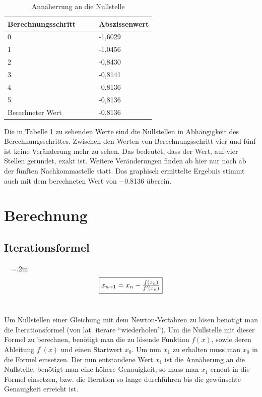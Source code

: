 \documentclass[a4paper,12pt,fleqn,oneside]{article}
\begin{document}
\FloatBarrier
		\begin{table}[]
			\centering
			\begin{tabular}{@{}ll@{}}
				\toprule
				Berechnungsschritt\ \ \ \ 		& Abszissenwert \\ \midrule
				0                  				& -1,6029       \\
				1                  				& -1,0456       \\
				2                  				& -0,8430       \\
				3                  				& -0,8141       \\
				4                  				& -0,8136       \\
				5                  				& -0,8136       \\
				Berechneter Wert   			& -0,8136       \\ \bottomrule
			\end{tabular}
			\caption{Annäherrung an die Nullstelle}
			\label{tab:nullstelle}
		\end{table}
		
\FloatBarrier
		
		\noindent
		Die in Tabelle \ref{tab:nullstelle} zu sehenden Werte sind die Nullstellen in Abhängigkeit des Berechnungsschrittes. Zwischen den Werten von
		Berechnungsschritt vier und fünf ist keine Veränderung mehr zu sehen. Das bedeutet, dass der Wert, auf vier Stellen gerundet, exakt ist.
		Weitere Veränderungen finden ab hier nur noch ab der fünften Nachkommastelle statt. Das graphisch ermittelte Ergebnis stimmt auch mit dem
		berechneten Wert von \num{-0.8136} überein.

\newpage

\section{Berechnung}
	\subsection{Iterationsformel}
		\ \ 
		{\fboxsep=.2in $$\framebox{$x_{n+1} = x_{n} - \frac{f(x_{n})}{f^\prime(x_{n})}$}$$}\ \ 
		 
		Um Nullstellen einer Gleichung mit dem Newton-Verfahren zu lösen benötigt man die Iterationsformel (von lat. iterare "`wiederholen"').
		Um die Nullstelle mit dieser Formel zu berechnen, benötigt man die zu lösende Funktion $f(x)$, sowie deren Ableitung $f^\prime(x)$ und einen
		Startwert $x_0$. Um nun $x_1$ zu erhalten muss man $x_0$ in die Formel einsetzen. Der nun entstandene Wert $x_1$ ist die Annäherung an
		die Nullstelle, benötigt man eine höhere Genauigkeit, so muss man $x_1$ erneut in die Formel einsetzen, bzw. die Iteration so lange durchführen
		bis die gewünschte Genauigkeit erreicht ist.
\end{document}
